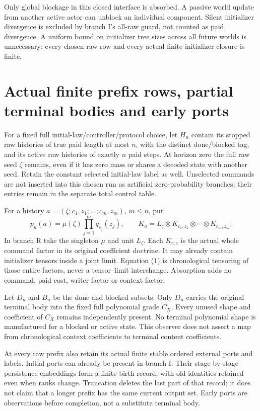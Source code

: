 \documentclass[11pt]{article}
\begin{document}
Only global blockage in this closed interface is absorbed. A passive world update from another active actor can unblock an individual component. Silent initializer divergence is excluded by branch I's all-raw guard, not counted as paid divergence. A uniform bound on initializer tree sizes across all future worlds is unnecessary: every chosen raw row and every actual finite initializer closure is finite.

\section{Actual finite prefix rows, partial terminal bodies and early ports}
For a fixed full initial-law/controller/protocol choice, let $H_n$ contain its stopped raw histories of true paid length at most $n$, with the distinct done/blocked tag, and its active raw histories of exactly $n$ paid steps. At horizon zero the full raw seed $\zeta$ remains, even if it has zero mass or shares a decoded state with another seed. Retain the constant selected initial-law label as well. Unselected commands are not inserted into this chosen run as artificial zero-probability branches; their entries remain in the separate total control table.

For a history $a=(\zeta;c_1,z_1;\ldots;c_m,z_m)$, $m\leq n$, put
\[
 p_n(a)=\mu(\zeta)\prod_{j=1}^m q_{c_j}(z_j),\qquad
 K_a=L_\zeta\otimes K_{c_1,z_1}\otimes\cdots\otimes K_{c_m,z_m}. \tag{1}
\]
In branch R take the singleton $\mu$ and unit $L_\zeta$. Each $K_{c,z}$ is the actual whole command factor in its original coefficient doctrine. It may already contain initializer tensors inside a joint limit. Equation (1) is chronological tensoring of those entire factors, never a tensor--limit interchange. Absorption adds no command, paid cost, writer factor or context factor.

Let $D_n$ and $B_n$ be the done and blocked subsets. Only $D_n$ carries the original terminal body into the fixed full polynomial grade $C_X$. Every unused shape and coefficient of $C_X$ remains independently present. No terminal polynomial shape is manufactured for a blocked or active state. This observer does not assert a map from chronological context coefficients to terminal content coefficients.

At every raw prefix also retain its actual finite stable ordered external ports and labels. Initial ports can already be present in branch I. Their stage-by-stage persistence embeddings form a finite birth record, with old identities retained even when ranks change. Truncation deletes the last part of that record; it does not claim that a longer prefix has the same current output set. Early ports are observations before completion, not a substitute terminal body.
\end{document}
